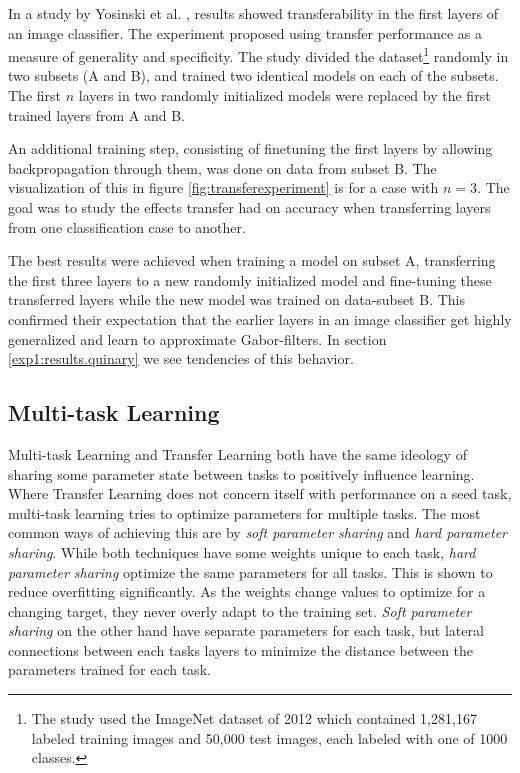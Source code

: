 In a study by Yosinski et al. \cite{yosinski2014transferable}, results showed transferability in the first layers of an image classifier. The experiment proposed using transfer performance as a measure of generality and specificity. The study divided the dataset\footnote{The study used the ImageNet dataset of 2012 which contained 1,281,167 labeled training images and 50,000 test images, each labeled with one of 1000 classes.} randomly in two subsets (A and B), and trained two identical models on each of the subsets. The first \(n\) layers in two randomly initialized models were replaced by the first trained layers from A and B. 

An additional training step, consisting of finetuning the first layers by allowing backpropagation through them, was done on data from subset B. The visualization of this in figure \ref{fig:transferexperiment} is for a case with \(n=3\). The goal was to study the effects transfer had on accuracy when transferring layers from one classification case to another. 

The best results were achieved when training a model on subset A, transferring the first three layers to a new randomly initialized model and fine-tuning these transferred layers while the new model was trained on data-subset B. This confirmed their expectation that the earlier layers in an image classifier get highly generalized and learn to approximate Gabor-filters. In section \ref{exp1:results.quinary} we see tendencies of this behavior. 

\subsection{Multi-task Learning}
Multi-task Learning and Transfer Learning both have the same ideology of sharing some parameter state between tasks to positively influence learning. Where Transfer Learning does not concern itself with performance on a seed task, multi-task learning tries to optimize parameters for multiple tasks. The most common ways of achieving this are by \textit{soft parameter sharing} and \textit{hard parameter sharing}. While both techniques have some weights unique to each task, \textit{hard parameter sharing} optimize the same parameters for all tasks. This is shown to reduce overfitting\cite{hardparametersharing} significantly. As the weights change values to optimize for a changing target, they never overly adapt to the training set. \textit{Soft parameter sharing} on the other hand have separate parameters for each task, but lateral connections between each tasks layers to minimize the distance between the parameters trained for each task.

